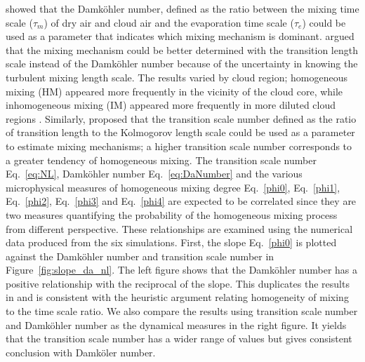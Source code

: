\documentclass[draft,jgrga]{AGUTeX}
\newcommand{\Eq}[1]{Eq.~\eqref{#1}} \newcommand{\Fig}[1]{Figure~\ref{#1}}
\begin{document}
\begin{article}
\cite{Burnet2007Observational} showed that the Damk\"{o}hler number, defined as the ratio between the mixing time scale ($\tau_m$) of dry air and cloud air and the evaporation time scale ($\tau_e$) could be used as a parameter that indicates which mixing mechanism is dominant. \cite{Lehmann2009} argued that the mixing mechanism could be better determined with the transition length scale instead of the Damk\"{o}hler number because of the uncertainty in knowing the turbulent mixing length scale. The results varied by cloud region; homogeneous mixing (HM) appeared more frequently in the vicinity of the cloud core, while inhomogeneous mixing (IM) appeared more frequently in more diluted cloud regions \cite{Lehmann2009}. Similarly, \cite{Lu2011} proposed that the transition scale number defined as the ratio of transition length to the Kolmogorov length scale could be used as a parameter to estimate mixing mechanisms; a higher transition scale number corresponds to a greater tendency of homogeneous mixing.
The transition scale number \Eq{eq:NL}, Damk\"{o}hler number \Eq{eq:DaNumber} and the various microphysical measures of homogeneous mixing degree \Eq{phi0}, \Eq{phi1}, \Eq{phi2}, \Eq{phi3} and \Eq{phi4} are expected to be correlated since they are two measures quantifying the probability of the homogeneous mixing process from different perspective. These relationships are examined using the numerical data produced from the six simulations.  First, the slope \Eq{phi0} is plotted against the Damk\"{o}hler number and transition scale number in \Fig{fig:slope_da_nl}. The left figure shows that the Damk\"{o}hler number has a positive relationship with the reciprocal of the slope. This duplicates the results in \cite{And09} and is consistent with the heuristic argument relating homogeneity of mixing to the time scale ratio. We also compare the results using transition scale number and Damk\"{o}hler number as the dynamical measures in the right figure. It yields that the transition scale number has a wider range of values but gives consistent conclusion with Damk\"{o}ler number.


\end{article}
\end{document}

